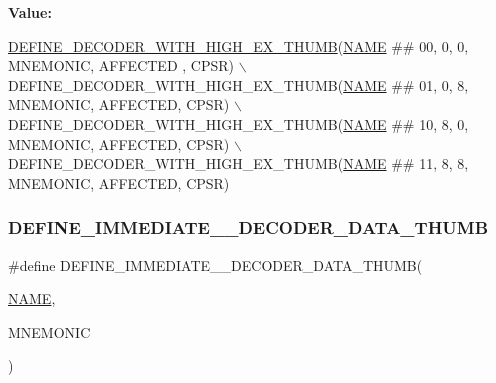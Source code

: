 {\bfseries Value\+:}
\begin{DoxyCode}
\mbox{\hyperlink{decoder-thumb_8c_a77b4e7b16f8500ba7de60167582fb945}{DEFINE\_DECODER\_WITH\_HIGH\_EX\_THUMB}}(\mbox{\hyperlink{inflate_8h_a164ea0159d5f0b5f12a646f25f99eceaa67bc2ced260a8e43805d2480a785d312}{NAME}} ## 00, 0, 0, MNEMONIC, AFFECTED
      , CPSR) \(\backslash\)
    DEFINE\_DECODER\_WITH\_HIGH\_EX\_THUMB(\mbox{\hyperlink{inflate_8h_a164ea0159d5f0b5f12a646f25f99eceaa67bc2ced260a8e43805d2480a785d312}{NAME}} ## 01, 0, 8, MNEMONIC, AFFECTED, CPSR) \(\backslash\)
    DEFINE\_DECODER\_WITH\_HIGH\_EX\_THUMB(\mbox{\hyperlink{inflate_8h_a164ea0159d5f0b5f12a646f25f99eceaa67bc2ced260a8e43805d2480a785d312}{NAME}} ## 10, 8, 0, MNEMONIC, AFFECTED, CPSR) \(\backslash\)
    DEFINE\_DECODER\_WITH\_HIGH\_EX\_THUMB(\mbox{\hyperlink{inflate_8h_a164ea0159d5f0b5f12a646f25f99eceaa67bc2ced260a8e43805d2480a785d312}{NAME}} ## 11, 8, 8, MNEMONIC, AFFECTED, CPSR)
\end{DoxyCode}
\mbox{\label{decoder-thumb_8c_a57aa04c5e278e74d252ea14947824828}} 
\subsubsection{\texorpdfstring{D\+E\+F\+I\+N\+E\+\_\+\+I\+M\+M\+E\+D\+I\+A\+T\+E\+\_\+\_\+\+D\+E\+C\+O\+D\+E\+R\+\_\+\+D\+A\+T\+A\+\_\+\+T\+H\+U\+MB}{DEFINE\_IMMEDIATE\_5\_DECODER\_DATA\_THUMB}}
{\footnotesize\ttfamily \#define D\+E\+F\+I\+N\+E\+\_\+\+I\+M\+M\+E\+D\+I\+A\+T\+E\+\_\+\_\+\+D\+E\+C\+O\+D\+E\+R\+\_\+\+D\+A\+T\+A\+\_\+\+T\+H\+U\+MB(\begin{DoxyParamCaption}\item[{}]{\mbox{\hyperlink{inflate_8h_a164ea0159d5f0b5f12a646f25f99eceaa67bc2ced260a8e43805d2480a785d312}{N\+A\+ME}},  }\item[{}]{M\+N\+E\+M\+O\+N\+IC }\end{DoxyParamCaption})}

